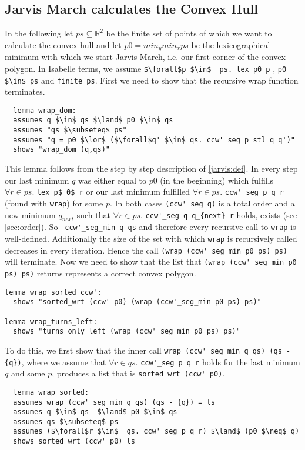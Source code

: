 \subsection{Jarvis March calculates the Convex Hull}
In the following let $ps \subseteq \mathbb{R}^2$ be the finite set of points of which we want to calculate
the convex hull and let $p0 = min_y min_x ps$ be the lexicographical minimum with which we start 
Jarvis March, i.e. our first corner of the convex polygon. In Isabelle terms, we assume 
\lstinline|$\forall$p $\in$  ps. lex p0 p| \space , \space  \lstinline|p0 $\in$ ps| \space  and \space  \lstinline|finite ps|.
First we need to show that the recursive wrap function terminates. 
\begin{lstlisting}
  lemma wrap_dom:
  assumes q $\in$ qs $\land$ p0 $\in$ qs
  assumes "qs $\subseteq$ ps"
  assumes "q = p0 $\lor$ ($\forall$q' $\in$ qs. ccw'_seg p_stl q q')"
  shows "wrap_dom (q,qs)"
\end{lstlisting}
This lemma follows from the step by step 
description of \ref*{jarvis:def}. In every step our last minimum $q$ was either equal to $p0$ (in the beginning) 
which fulfills $\forall r \in ps.$ \lstinline|lex p$_0$ r| or our last minimum fulfilled 
$\forall r \in ps.$ \lstinline|ccw'_seg p q r| (found with \lstinline|wrap|) for some $p$.
In both cases \lstinline|(ccw'_seg q)| is a total order and a new minimum $q_{next}$ such that 
$\forall r \in ps.$ \lstinline|ccw'_seg q q_{next} r| holds, exists (see \ref*{sec:order}). So 
\lstinline| ccw'_seg_min q qs| and therefore every recursive call to \lstinline|wrap| is well-defined. 
Additionally the size of the set with which \lstinline|wrap| is recursively called 
decreases in every iteration. Hence the call  \lstinline|(wrap (ccw'_seg_min p0 ps) ps)|
will terminate.
Now we need to show that the list that \lstinline|(wrap (ccw'_seg_min p0 ps) ps)| 
returns represents a correct convex polygon.
\begin{lstlisting}
lemma wrap_sorted_ccw':
  shows "sorted_wrt (ccw' p0) (wrap (ccw'_seg_min p0 ps) ps)"

lemma wrap_turns_left:
  shows "turns_only_left (wrap (ccw'_seg_min p0 ps) ps)"
\end{lstlisting}
To do this, we first show that the inner call \lstinline|wrap (ccw'_seg_min q qs) (qs - {q})|,
where we assume that $\forall r \in  qs.$ \lstinline|ccw'_seg p q r| holds
for the last minimum $q$ and some $p$, produces a list that is \lstinline|sorted_wrt (ccw' p0)|.
\begin{lstlisting}
  lemma wrap_sorted:
  assumes wrap (ccw'_seg_min q qs) (qs - {q}) = ls
  assumes q $\in$ qs  $\land$ p0 $\in$ qs
  assumes qs $\subseteq$ ps
  assumes ($\forall$r $\in$  qs. ccw'_seg p q r) $\land$ (p0 $\neq$ q)
  shows sorted_wrt (ccw' p0) ls
\end{lstlisting}




